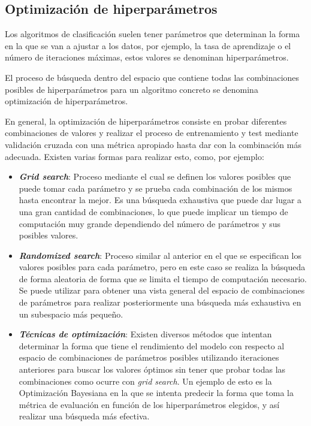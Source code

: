 \subsection{Optimización de hiperparámetros}

Los algoritmos de clasificación suelen tener parámetros que determinan la forma
en la que se van a ajustar a los datos, por ejemplo, la tasa de aprendizaje o el
número de iteraciones máximas, estos valores se denominan hiperparámetros.

El proceso de búsqueda dentro del espacio que contiene todas las combinaciones
posibles de hiperparámetros para un algoritmo concreto se denomina optimización
de hiperparámetros.

En general, la optimización de hiperparámetros consiste en probar diferentes
combinaciones de valores y realizar el proceso de entrenamiento y test mediante
validación cruzada con una métrica apropiado hasta dar con la combinación más
adecuada. Existen varias formas para realizar esto, como, por ejemplo:

\begin{itemize}
    \item \textbf{\textit{Grid search}}: Proceso mediante el cual se definen los
    valores posibles que puede tomar cada parámetro y se prueba cada combinación
    de los mismos hasta encontrar la mejor. Es una búsqueda exhaustiva que puede
    dar lugar a una gran cantidad de combinaciones, lo que puede implicar un
    tiempo de computación muy grande dependiendo del número de parámetros y sus
    posibles valores.
    \item \textbf{\textit{Randomized search}}: Proceso similar al anterior en el
    que se especifican los valores posibles para cada parámetro, pero en este
    caso se realiza la búsqueda de forma aleatoria de forma que se limita el
    tiempo de computación necesario. Se puede utilizar para obtener una vista
    general del espacio de combinaciones de parámetros para realizar
    posteriormente una búsqueda más exhaustiva en un subespacio más pequeño.
    \item \textbf{\textit{Técnicas de optimización}}: Existen diversos métodos
    que intentan determinar la forma que tiene el rendimiento del modelo con
    respecto al espacio de combinaciones de parámetros posibles utilizando
    iteraciones anteriores para buscar los valores óptimos sin tener que probar
    todas las combinaciones como ocurre con \textit{grid search}. Un ejemplo de
    esto es la Optimización Bayesiana \cite{wu2019hyperparameter} en la que se
    intenta predecir la forma que toma la métrica de evaluación en función de
    los hiperparámetros elegidos, y así realizar una búsqueda más efectiva.
\end{itemize}
